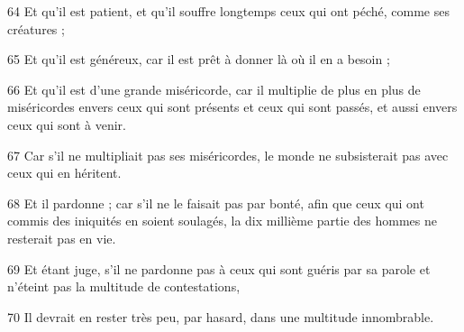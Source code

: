 \par 64 Et qu'il est patient, et qu'il souffre longtemps ceux qui ont péché, comme ses créatures ;
\par 65 Et qu'il est généreux, car il est prêt à donner là où il en a besoin ;
\par 66 Et qu'il est d'une grande miséricorde, car il multiplie de plus en plus de miséricordes envers ceux qui sont présents et ceux qui sont passés, et aussi envers ceux qui sont à venir.
\par 67 Car s'il ne multipliait pas ses miséricordes, le monde ne subsisterait pas avec ceux qui en héritent.
\par 68 Et il pardonne ; car s'il ne le faisait pas par bonté, afin que ceux qui ont commis des iniquités en soient soulagés, la dix millième partie des hommes ne resterait pas en vie.
\par 69 Et étant juge, s'il ne pardonne pas à ceux qui sont guéris par sa parole et n'éteint pas la multitude de contestations,
\par 70 Il devrait en rester très peu, par hasard, dans une multitude innombrable.


